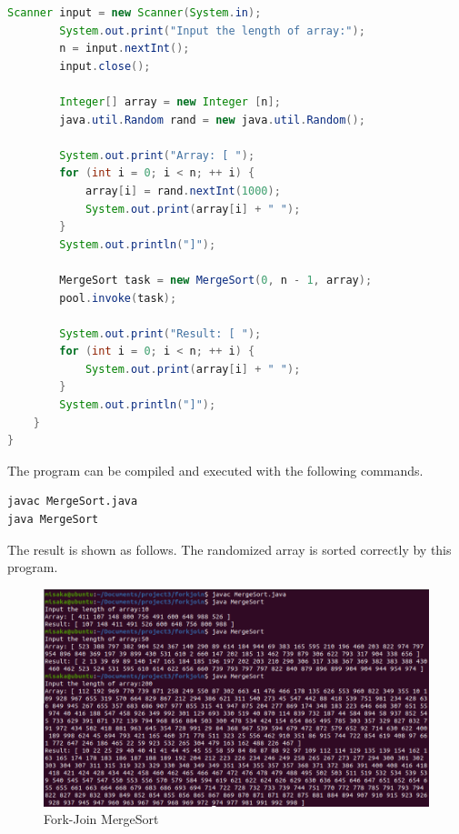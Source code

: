 \documentclass[UTF8,10pt,a4paper]{article}
\theoremstyle{Problem}
\theoremstyle{Solution}
\begin{document}
\begin{lstlisting}[language = java]
        Scanner input = new Scanner(System.in);
        System.out.print("Input the length of array:");
        n = input.nextInt();
        input.close();

        Integer[] array = new Integer [n];
        java.util.Random rand = new java.util.Random();

        System.out.print("Array: [ ");
        for (int i = 0; i < n; ++ i) {
            array[i] = rand.nextInt(1000);
            System.out.print(array[i] + " ");
        }
		System.out.println("]");	
        
        MergeSort task = new MergeSort(0, n - 1, array);
        pool.invoke(task);

        System.out.print("Result: [ ");
        for (int i = 0; i < n; ++ i) {
            System.out.print(array[i] + " ");
        }
		System.out.println("]");	
    }
}
\end{lstlisting}



The program can be compiled and executed with the following commands.

\begin{lstlisting}
javac MergeSort.java
java MergeSort
\end{lstlisting}


The result is shown as follows. The randomized array is sorted correctly by this program.
\begin{figure}[H]
    \centering
    \includegraphics[width=400pt]{merge.png}
    \caption{Fork-Join MergeSort}
    \label{3}
\end{figure}
\end{document}
